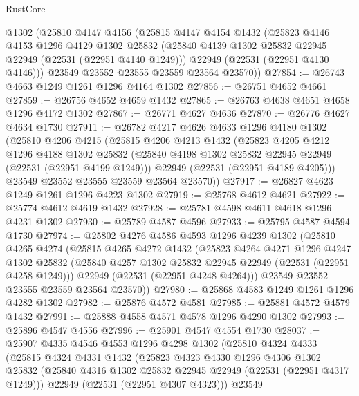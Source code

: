 \begin{lexlean}{RustCore}
\begin{coremodule}
    @1302
    (@25810
      @4147
      @4156
      (@25815
        @4147
        @4154
        @1432
        (@25823
          @4146
          @4153
          @1296
          @4129
          @1302
          @25832
          (@25840 @4139 @1302 @25832 @22945 @22949 (@22531 (@22951 @4140 @1249)))
          @22949
          (@22531 (@22951 @4130 @4146)))
        @23549
        @23552
        @23555
        @23559
        @23564
        @23570))
@27854 := @26743 @4663 @1249 @1261 @1296 @4164 @1302
@27856 := @26751 @4652 @4661
@27859 := @26756 @4652 @4659 @1432
@27865 := @26763 @4638 @4651 @4658 @1296 @4172 @1302
@27867 := @26771 @4627 @4636
@27870 := @26776 @4627 @4634 @1730
@27911 := @26782
    @4217
    @4626
    @4633
    @1296
    @4180
    @1302
    (@25810
      @4206
      @4215
      (@25815
        @4206
        @4213
        @1432
        (@25823
          @4205
          @4212
          @1296
          @4188
          @1302
          @25832
          (@25840 @4198 @1302 @25832 @22945 @22949 (@22531 (@22951 @4199 @1249)))
          @22949
          (@22531 (@22951 @4189 @4205)))
        @23549
        @23552
        @23555
        @23559
        @23564
        @23570))
@27917 := @26827 @4623 @1249 @1261 @1296 @4223 @1302
@27919 := @25768 @4612 @4621
@27922 := @25774 @4612 @4619 @1432
@27928 := @25781 @4598 @4611 @4618 @1296 @4231 @1302
@27930 := @25789 @4587 @4596
@27933 := @25795 @4587 @4594 @1730
@27974 := @25802
    @4276
    @4586
    @4593
    @1296
    @4239
    @1302
    (@25810
      @4265
      @4274
      (@25815
        @4265
        @4272
        @1432
        (@25823
          @4264
          @4271
          @1296
          @4247
          @1302
          @25832
          (@25840 @4257 @1302 @25832 @22945 @22949 (@22531 (@22951 @4258 @1249)))
          @22949
          (@22531 (@22951 @4248 @4264)))
        @23549
        @23552
        @23555
        @23559
        @23564
        @23570))
@27980 := @25868 @4583 @1249 @1261 @1296 @4282 @1302
@27982 := @25876 @4572 @4581
@27985 := @25881 @4572 @4579 @1432
@27991 := @25888 @4558 @4571 @4578 @1296 @4290 @1302
@27993 := @25896 @4547 @4556
@27996 := @25901 @4547 @4554 @1730
@28037 := @25907
    @4335
    @4546
    @4553
    @1296
    @4298
    @1302
    (@25810
      @4324
      @4333
      (@25815
        @4324
        @4331
        @1432
        (@25823
          @4323
          @4330
          @1296
          @4306
          @1302
          @25832
          (@25840 @4316 @1302 @25832 @22945 @22949 (@22531 (@22951 @4317 @1249)))
          @22949
          (@22531 (@22951 @4307 @4323)))
        @23549

\end{coremodule}
\end{lexlean}
